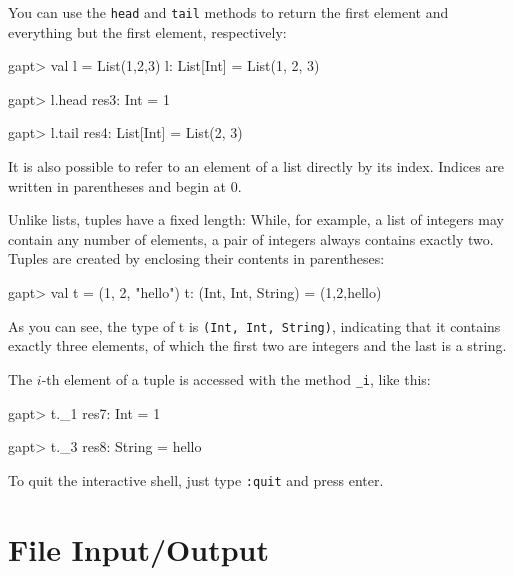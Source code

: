 \documentclass[a4paper,11pt]{article}
\begin{document}
You can use the \texttt{head} and \texttt{tail} methods to return the first
element and everything but the first element, respectively:

\begin{clilisting}
gapt> val l = List(1,2,3)
l: List[Int] = List(1, 2, 3)

gapt> l.head
res3: Int = 1

gapt> l.tail
res4: List[Int] = List(2, 3)

\end{clilisting}

It is also possible to refer to an element of a list directly by its index. Indices are
written in parentheses and begin at 0.


Unlike lists, tuples have a fixed length: While, for example, a list of integers may contain
any number of elements, a pair of integers always contains exactly two. Tuples are created
by enclosing their contents in parentheses:

\begin{clilisting}
gapt> val t = (1, 2, "hello")
t: (Int, Int, String) = (1,2,hello)

\end{clilisting}

As you can see, the type of t is \texttt{(Int, Int, String)}, indicating that it contains
exactly three elements, of which the first two are integers and the last is a string.

The $i$-th element of a tuple is accessed with the method \texttt{\_i}, like this:

\begin{clilisting}
gapt> t._1
res7: Int = 1

gapt> t._3
res8: String = hello

\end{clilisting}

To quit the interactive shell, just type \texttt{:quit} and press enter.


\section{File Input/Output}\label{sec.fileio}
\end{document}
